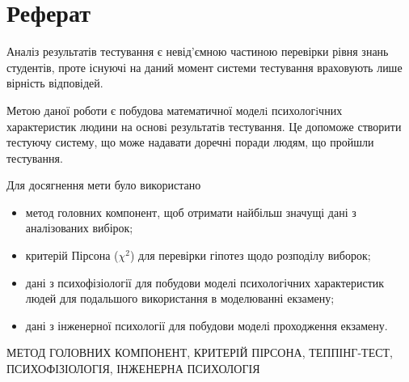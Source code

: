 \chapter*{Реферат}

Аналіз результатів тестування є невід’ємною частиною перевірки рівня знань
студентів, проте існуючі на даний момент системи тестування враховують
лише вірність відповідей.

Метою даної роботи є побудова математичної моделi психологiчних характеристик
людини на основi результатiв тестування.
Це допоможе створити тестуючу систему, що може надавати доречні поради людям,
що пройшли тестування.

Для досягнення мети було використано
\begin{itemize}
  \item 
    метод головних компонент, щоб отримати найбільш значущі дані з аналізованих
    вибірок;
  \item
    критерій Пірсона ($\chi^2$) для перевірки гіпотез щодо розподілу виборок;
  \item
    дані з психофізіології для побудови моделі психологічних характеристик
    людей для подальшого використання в моделюванні екзамену;
  \item
    дані з інженерної психології для побудови моделі проходження екзамену.
\end{itemize}

\MakeUppercase{Метод головних компонент, критерій Пірсона, теппінг-тест,
психофізіологія, інженерна психологія}
